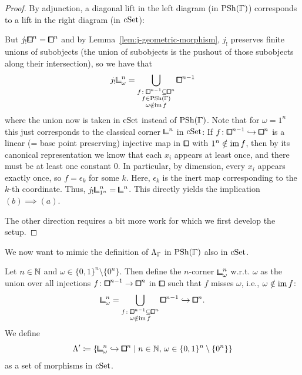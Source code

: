 \begin{proof}
By adjunction, a diagonal lift in the left diagram (in $\PSh(\bbGamma)$) corresponds to a lift in the right diagram (in $\mathrm{cSet}$):
\begin{center}
\end{center}
But $j_!{\bblox}^n = {\bbox}^n$ and by Lemma~\ref{lem:j-geometric-morphism}, $j_!$ preserves finite unions of subobjects
(the union of subobjects is the pushout of those subobjects along their intersection), so we have that
\[
    j_!{\bbcor}^n_\omega = \bigcup_{\substack{f\colon{\bbox}^{n-1}\sub{\bbox}^n \\ f\in\PSh(\bbGamma) \\ \omega\notin\im f}}{\bbox}^{n-1}
\]
where the union now is taken in $\mathrm{cSet}$ instead of $\PSh(\bbGamma)$.
Note that for $\omega=1^n$ this just corresponds to the classical corner ${\bbcor}^n$ in $\mathrm{cSet}$:
If $f\colon{\bbox}^{n-1}\hookrightarrow{\bbox}^n$ is a linear (= base point preserving) injective map in $\bbox$ with $1^n\notin\operatorname{im} f$,
then by its canonical representation we know that each $x_i$ appears at least once, and there must be at least one constant $0$.
In particular, by dimension, every $x_i$ appears exactly once, so $f=\epsilon_k$ for some $k$.
Here, $\epsilon_k$ is the inert map corresponding to the $k$-th coordinate.
Thus, $j_!{\bbcor}^n_{1^n} = {\bbcor}^n$.
This directly yields the implication $(b)\implies (a)$.

The other direction requires a bit more work for which we first develop the setup.
\end{proof}

We now want to mimic the definition of $\Lambda_{\bbGamma}$ in $\PSh(\bbGamma)$ also in $\mathrm{cSet}$.

\begin{definition}
Let $n\in{\mathbb{N}}$ and $\omega\in\{0,1\}^n\setminus\{0^n\}$.
Then define the $n$-corner ${\bbcor}^n_\omega$ w.r.t. $\omega$ as the union over all injections
$f\colon{\bbox}^{n-1}\to{\bbox}^n$ in $\bbox$ such that $f$ misses $\omega$, i.e., $\omega\notin\operatorname{im} f$:
\[
    {\bbcor}^n_\omega = \bigcup_{\substack{f\colon{\bbox}^{n-1}\sub{\bbox}^n \\ \omega\notin\im f}}{\bbox}^{n-1}\hookrightarrow{\bbox}^n.
\]
We define
\[
    \Lambda' \coloneq \{{\bbcor}^n_\omega\hookrightarrow{\bbox}^n \mid n\in\N,\,\omega\in\{0,1\}^n\setminus\{0^n\}\}
\]
as a set of morphisms in $\mathrm{cSet}$.
\end{definition}

